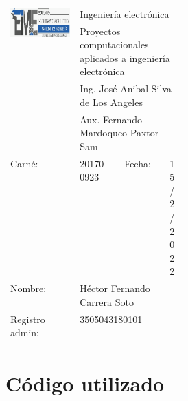 \documentclass[12pt,letterpaper]{article}
\begin{document}

\begin{title}

\begin{table}[H]
\begin{center}
\begin{tabular}{|c|m{0.20\linewidth}|c|m{0.10\linewidth}|}
\multirow{4}{*}{\includegraphics[scale=0.3]{EIME.png}}                                                         & \multicolumn{3}{l}{Ingeniería electrónica}                                       \\
                                                                                & \multicolumn{3}{l}{Proyectos computacionales aplicados a ingeniería electrónica} \\
                                                                                & \multicolumn{3}{l}{Ing. José Anibal Silva de Los Angeles}                        \\
                                                                                & \multicolumn{3}{l}{Aux. Fernando Mardoqueo Paxtor Sam}                           \\ \hline 
	\multicolumn{1}{|l|}{Carné:} & 201700923 & Fecha: & \multicolumn{1}{l|}{15/2/2022}\\ 
	\hline 
	\multicolumn{1}{|l|}{Nombre:} & \multicolumn{3}{l|}{Héctor Fernando Carrera Soto} \\ 
	\hline 
	\multicolumn{1}{|l|}{Registro admin:} & \multicolumn{3}{l|}{3505043180101} \\ 
	\hline 
	\end{tabular} 
\end{center}
\end{table}

\end{title}


\section{Código utilizado}
\end{document}
